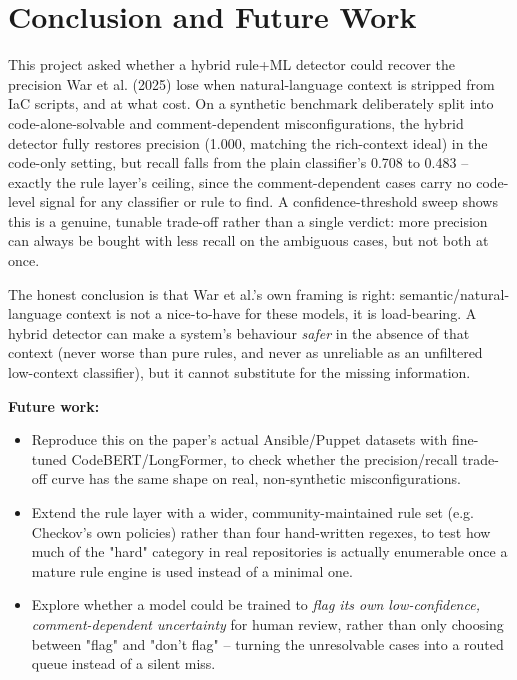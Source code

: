 
\section{Conclusion and Future Work}
\label{sec:Conclusion}

This project asked whether a hybrid rule+ML detector could recover the precision War et al. (2025) lose when natural-language context is stripped from IaC scripts, and at what cost. On a synthetic benchmark deliberately split into code-alone-solvable and comment-dependent misconfigurations, the hybrid detector fully restores precision (1.000, matching the rich-context ideal) in the code-only setting, but recall falls from the plain classifier's 0.708 to 0.483 -- exactly the rule layer's ceiling, since the comment-dependent cases carry no code-level signal for any classifier or rule to find. A confidence-threshold sweep shows this is a genuine, tunable trade-off rather than a single verdict: more precision can always be bought with less recall on the ambiguous cases, but not both at once.

The honest conclusion is that War et al.'s own framing is right: semantic/natural-language context is not a nice-to-have for these models, it is load-bearing. A hybrid detector can make a system's behaviour \emph{safer} in the absence of that context (never worse than pure rules, and never as unreliable as an unfiltered low-context classifier), but it cannot substitute for the missing information.

\textbf{Future work:}
\begin{itemize}
  \item Reproduce this on the paper's actual Ansible/Puppet datasets with fine-tuned CodeBERT/LongFormer, to check whether the precision/recall trade-off curve has the same shape on real, non-synthetic misconfigurations.
  \item Extend the rule layer with a wider, community-maintained rule set (e.g. Checkov's own policies) rather than four hand-written regexes, to test how much of the "hard" category in real repositories is actually enumerable once a mature rule engine is used instead of a minimal one.
  \item Explore whether a model could be trained to \emph{flag its own low-confidence, comment-dependent uncertainty} for human review, rather than only choosing between "flag" and "don't flag" -- turning the unresolvable cases into a routed queue instead of a silent miss.
\end{itemize}

